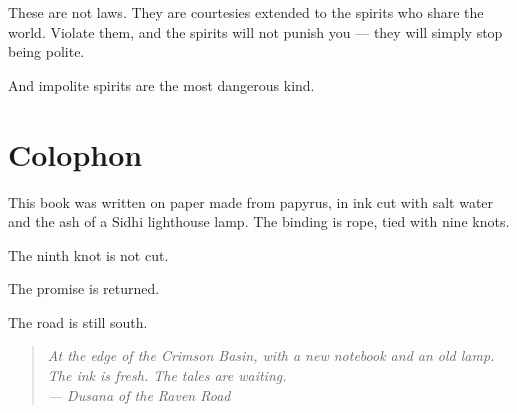 \documentclass[10pt,twoside]{book}
\newcommand{\dusana}[1]{\begin{quote}\itshape #1 \\ --- Dusana of the Raven Road\end{quote}}
\begin{document}
These are not laws. They are courtesies extended to the spirits who share the world. Violate them, and the spirits will not punish you --- they will simply stop being polite.

And impolite spirits are the most dangerous kind.

\chapter*{Colophon}

This book was written on paper made from papyrus, in ink cut with salt water and the ash of a Sidhi lighthouse lamp. The binding is rope, tied with nine knots.

The ninth knot is not cut.

The promise is returned.

The road is still south.

\dusana{At the edge of the Crimson Basin, with a new notebook and an old lamp. The ink is fresh. The tales are waiting.}
\end{document}
